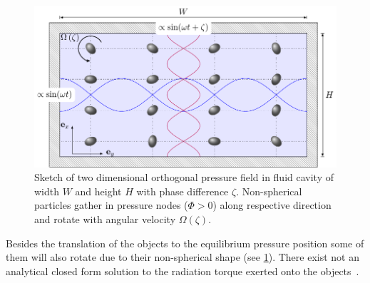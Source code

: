 \begin{figure}[tbp]
  \centering
  \includegraphics[]{Plots/cache/viscous_torque.pdf}
  \caption{Sketch of two dimensional orthogonal pressure field in fluid cavity 
  of width $W$ and height $H$ with phase difference $\zeta$. Non-spherical 
particles gather in pressure nodes ($\Phi > 0$) along respective direction and 
rotate with angular velocity $\Omega\left( \zeta \right)$.}
  \label{fig:TA-viscous_torque}
\end{figure}

Besides the translation of the objects to the equilibrium pressure position 
some of them will also rotate due to their non-spherical shape (see 
\cref{fig:TA-viscous_torque}). There exist not an analytical closed form 
solution to the radiation torque exerted onto the objects~\cite{Lamprecht2017}.

